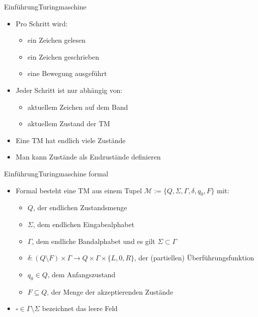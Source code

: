 \documentclass[ignorenonframetext,]{beamer}
\begin{document}
\begin{frame}{Einführung}{Turingmaschine}

\begin{itemize}
\itemsep1pt\parskip0pt
\item
  Pro Schritt wird:

  \begin{itemize}
  \itemsep1pt\parskip0pt
  \item
    ein Zeichen gelesen
  \item
    ein Zeichen geschrieben
  \item
    eine Bewegung ausgeführt
  \end{itemize}
\item
  Jeder Schritt ist nur abhängig von:

  \begin{itemize}
  \itemsep1pt\parskip0pt
  \item
    aktuellem Zeichen auf dem Band
  \item
    aktuellem Zustand der TM
  \end{itemize}
\item
  Eine TM hat endlich viele Zustände
\item
  Man kann Zustände als Endzustände definieren
\end{itemize}

\end{frame}

\begin{frame}{Einführung}{Turingmaschine formal}

\begin{itemize}
\itemsep1pt\parskip0pt
\item
  Formal besteht eine TM aus einem Tupel
  $\mathcal{M}:=\{ Q, \Sigma, \Gamma, \delta, q_0, F \}$ mit:

  \begin{itemize}
  \itemsep1pt\parskip0pt
  \item
    $Q$, der endlichen Zustandsmenge
  \item
    $\Sigma$, dem endlichen Eingabealphabet
  \item
    $\Gamma$, dem endliche Bandalphabet und es gilt
    $\Sigma \subset \Gamma$
  \item
    $\delta\colon (Q \setminus F)\times \Gamma \to Q \times \Gamma \times \{L, 0, R\}$,
    der (partiellen) Überführungsfunktion
  \item
    $q_0 \in Q$, dem Anfangszustand
  \item
    $F \subseteq Q$, der Menge der akzeptierenden Zustände
  \end{itemize}
  \item
    $\square \in \Gamma\setminus\Sigma$ bezeichnet das leere Feld
\end{itemize}

\end{frame}
\end{document}
